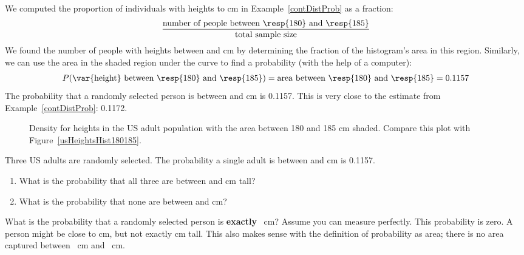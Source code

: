 We computed the proportion of individuals with heights  to  cm in Example~\ref{contDistProb} as a fraction:
\begin{align*}
\frac{\text{number of people between \resp{180} and \resp{185}}}{\text{total sample size}}
\end{align*}
We found the number of people with heights between  and  cm by determining the fraction of the histogram's area in this region. Similarly, we can use the area in the shaded region under the curve to find a probability (with the help of a computer):
\begin{align*}
P(\text{\var{height} between \resp{180} and \resp{185}})
	= \text{area between \resp{180} and \resp{185}}
	= 0.1157
\end{align*}
The probability that a randomly selected person is between  and  cm is 0.1157. This is very close to the estimate from Example~\ref{contDistProb}: 0.1172. 

\begin{figure}[h]
  \centering
  \caption{Density for heights in the US adult population
      with the area between 180 and 185 cm shaded.
      Compare this plot with Figure~\ref{usHeightsHist180185}.}
  \label{fdicHeightContDistFilled}
\end{figure}

\begin{exercisewrap}
\begin{nexercise}
Three US adults are randomly selected. The probability a single adult is between  and  cm is 0.1157.\footnotemark\vspace{-1.5mm}
\begin{enumerate}
\setlength{\itemsep}{0mm}
\item[(a)] What is the probability that all three are between  and  cm tall?
\item[(b)] What is the probability that none are between  and  cm?
\end{enumerate}
\end{nexercise}
\end{exercisewrap}

\begin{examplewrap}
\begin{nexample}{What is the probability that a randomly selected person is \textbf{exactly} ~cm? Assume you can measure perfectly.}
\label{probabilityOfExactly180cm}
This probability is zero. A person might be close to  cm, but not exactly  cm tall. This also makes sense with the definition of probability as area; there is no area captured between ~cm and ~cm.
\end{nexample}
\end{examplewrap}

